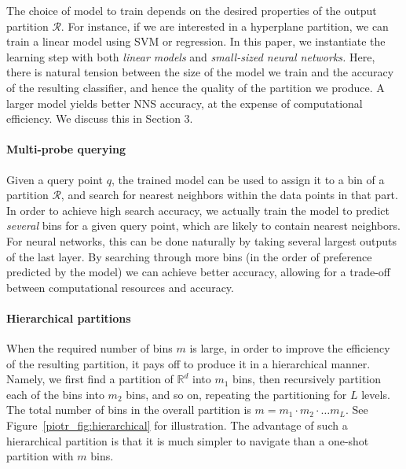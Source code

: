 \documentclass[11pt]{article}
\begin{document}
The choice of model to train depends on the desired properties of the output partition $\mathcal{R}$.
For instance, if we are interested in a hyperplane partition,
we can train a linear model using SVM or regression.  In this paper, we instantiate the learning step with both \emph{linear models}
and \emph{small-sized neural networks.}
Here, there is natural tension between the size of the model we train and the accuracy of the resulting classifier, and hence the quality of the partition we produce.
A larger model yields better NNS accuracy, at the expense of computational efficiency.
We discuss this in Section 3.

\paragraph{Multi-probe querying}
Given a query point $q$, the trained model can be used to assign it to a bin of a partition $\mathcal{R}$, and search for nearest neighbors within the data points in that part.
In order to achieve high search accuracy,
we actually train the model to predict \emph{several} bins for a given query point,
which are likely to contain nearest neighbors.
For neural networks, this can
be done naturally by taking several largest outputs of the last layer.
By searching through more bins (in the order of preference predicted by the model) we can achieve better accuracy, allowing for a trade-off between computational resources and accuracy.


\paragraph{Hierarchical partitions} When the required number of bins $m$ is large, in order to improve the efficiency of the resulting partition,
it pays off to produce it in a hierarchical manner. Namely, we first find a partition of $\mathbb{R}^d$ into $m_1$ bins, then recursively partition each
of the bins into $m_2$ bins, and so on, repeating the partitioning for $L$ levels.
The total number of bins in the overall partition is $m = m_1 \cdot m_2 \cdot \ldots m_L$.
See Figure~\ref{piotr_fig:hierarchical} for illustration.
The advantage of such a hierarchical partition is that it is much simpler to navigate
than a one-shot partition with $m$ bins.
\end{document}
